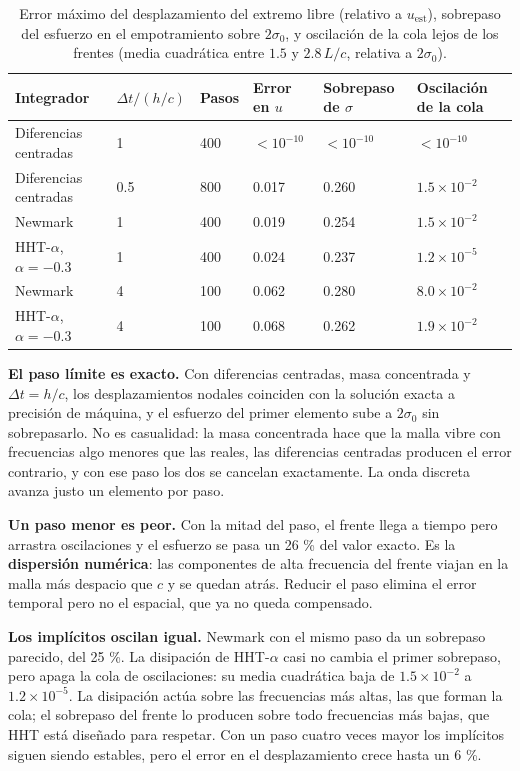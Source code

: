 \documentclass[11pt,oneside]{report}
\begin{document}
\begin{table}[h]
\centering
\caption{Error máximo del desplazamiento del extremo libre (relativo a $u_{\mathrm{est}}$), sobrepaso del esfuerzo en el empotramiento sobre $2\sigma_0$, y oscilación de la cola lejos de los frentes (media cuadrática entre $1.5$ y $2.8\,L/c$, relativa a $2\sigma_0$).}
\begin{tabularx}{\textwidth}{YYYYYY}
\hline
\textbf{Integrador} & \textbf{$\Delta t/(h/c)$} & \textbf{Pasos} & \textbf{Error en $u$} & \textbf{Sobrepaso de $\sigma$} & \textbf{Oscilación de la cola} \\
\hline
Diferencias centradas & 1 & 400 & $< 10^{-10}$ & $< 10^{-10}$ & $< 10^{-10}$ \\
Diferencias centradas & 0.5 & 800 & 0.017 & 0.260 & $1.5\times 10^{-2}$ \\
Newmark & 1 & 400 & 0.019 & 0.254 & $1.5\times 10^{-2}$ \\
HHT-\ensuremath{\alpha}, $\alpha = -0.3$ & 1 & 400 & 0.024 & 0.237 & $1.2\times 10^{-5}$ \\
Newmark & 4 & 100 & 0.062 & 0.280 & $8.0\times 10^{-2}$ \\
HHT-\ensuremath{\alpha}, $\alpha = -0.3$ & 4 & 100 & 0.068 & 0.262 & $1.9\times 10^{-2}$ \\
\hline
\end{tabularx}
\end{table}
\textbf{El paso límite es exacto.} Con diferencias centradas, masa concentrada y $\Delta t = h/c$, los desplazamientos nodales coinciden con la solución exacta a precisión de máquina, y el esfuerzo del primer elemento sube a $2\sigma_0$ sin sobrepasarlo. No es casualidad: la masa concentrada hace que la malla vibre con frecuencias algo menores que las reales, las diferencias centradas producen el error contrario, y con ese paso los dos se cancelan exactamente. La onda discreta avanza justo un elemento por paso.

\textbf{Un paso menor es peor.} Con la mitad del paso, el frente llega a tiempo pero arrastra oscilaciones y el esfuerzo se pasa un 26 \% del valor exacto. Es la \textbf{dispersión numérica}: las componentes de alta frecuencia del frente viajan en la malla más despacio que $c$ y se quedan atrás. Reducir el paso elimina el error temporal pero no el espacial, que ya no queda compensado.

\textbf{Los implícitos oscilan igual.} Newmark con el mismo paso da un sobrepaso parecido, del 25 \%. La disipación de HHT-\ensuremath{\alpha} casi no cambia el primer sobrepaso, pero apaga la cola de oscilaciones: su media cuadrática baja de $1.5\times 10^{-2}$ a $1.2\times 10^{-5}$. La disipación actúa sobre las frecuencias más altas, las que forman la cola; el sobrepaso del frente lo producen sobre todo frecuencias más bajas, que HHT está diseñado para respetar. Con un paso cuatro veces mayor los implícitos siguen siendo estables, pero el error en el desplazamiento crece hasta un 6 \%.
\end{document}
